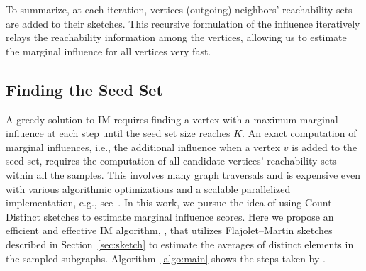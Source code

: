 \documentclass[final,5p,times,twocolumn]{elsarticle}
\newcommand\acro{{\sc{HyperFuseR\xspace}\xspace}\xspace}
\begin{document}
To summarize, at each iteration, vertices (outgoing) neighbors' reachability sets are added to their sketches.
This recursive formulation of the influence iteratively relays the reachability information among the vertices, allowing us to estimate the marginal influence for all vertices very fast.

\subsection{Finding the Seed Set}
A greedy solution to IM requires finding a vertex with a maximum marginal influence at each step until the seed set size reaches $K$.
An exact computation of marginal influences, i.e., the additional influence when a vertex $v$ is added to the seed set, requires the computation of all candidate vertices' reachability sets within all the samples. This involves many graph traversals and is expensive even with various algorithmic optimizations and a scalable parallelized implementation, e.g., see~\cite{infuser}. %
In this work, we pursue the idea of using Count-Distinct sketches to estimate marginal influence scores. Here we propose an efficient and effective IM algorithm, \acro, that utilizes Flajolet–Martin sketches described in Section~\ref{sec:sketch} to estimate the averages of distinct elements in the sampled subgraphs. Algorithm~\ref{algo:main} shows the steps taken by \acro.
\end{document}
